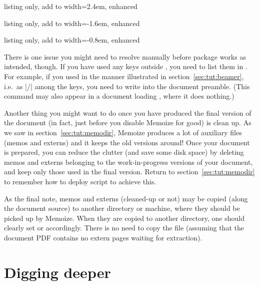 \documentclass[a4paper,11pt]{article}
\begin{document}
\begin{tcbraster}[raster columns=3, raster force size=false, raster valign=top]
  \begin{tcblisting}{listing only, add to width=2.4em, enhanced}
\usepackage[~disable~]{memoize}
  \end{tcblisting}
  \begin{tcblisting}{listing only, add to width=-1.6em, enhanced}
\usepackage{memoize}
  \end{tcblisting}
  \begin{tcblisting}{listing only, add to width=-0.8em, enhanced}
\usepackage{~no~memoize}
  \end{tcblisting}
\end{tcbraster}

There is one issue you might need to resolve manually before package
 works as intended, though.  If you have used any
 keys outside , you need to list them in
.  For example, if you used  in the
manner illustrated in section~\ref{sec:tut:beamer}, i.e.\ as
|/| among the \TikZ keys, you need to
write  into the document
preamble.  (This command may also appear in a document loading ,
where it does nothing.)

Another thing you might want to do once you have produced the final version of
the document (in fact, just before you disable Memoize for good) is clean up.
As we saw in section~\ref{sec:tut:memodir}, Memoize produces a lot of auxiliary
files (memos and externs) and it keeps the old versions around!  Once your
document is prepared, you can reduce the clutter (and save some disk space) by
deleting memos and externs belonging to the work-in-progress versions of your
document, and keep only those used in the final version.  Return to
section~\ref{sec:tut:memodir} to remember how to deploy script
 to achieve this.

As the final note, memos and externs (cleaned-up or not) may be copied (along
the document source) to another directory or machine, where they should be
picked up by Memoize.  When they are copied to another directory, one should
clearly set  or  accordingly.  There is no need
to copy the \dmmz file (assuming that the document PDF contains no extern pages
waiting for extraction).


\section{Digging deeper}
\label{sec:potential-pitfalls}
\end{document}
